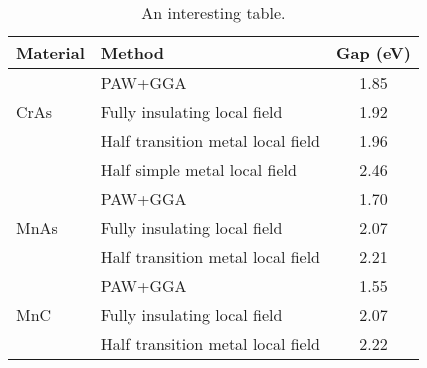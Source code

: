 \begingroup
\begin{table}[p!]
\begin{center}
\begin{tabular}{l|lc}
\hline
\hline
Material & Method                            & \multicolumn{1}{c}{Gap (eV)} \\
\hline
         & PAW+GGA                           & 1.85 \\
CrAs     & Fully insulating local field      & 1.92 \\
         & Half transition metal local field & 1.96 \\
         & Half simple metal local field     & 2.46 \\
\hline
         & PAW+GGA                           & 1.70 \\
MnAs     & Fully insulating local field      & 2.07 \\
         & Half transition metal local field & 2.21 \\
\hline
         & PAW+GGA                           & 1.55 \\
MnC      & Fully insulating local field      & 2.07 \\
         & Half transition metal local field & 2.22 \\
\hline
\hline
\end{tabular}\end{center}
\caption{%
  \label{tbl:atable}%
  An interesting table.
}
\end{table}
\endgroup
